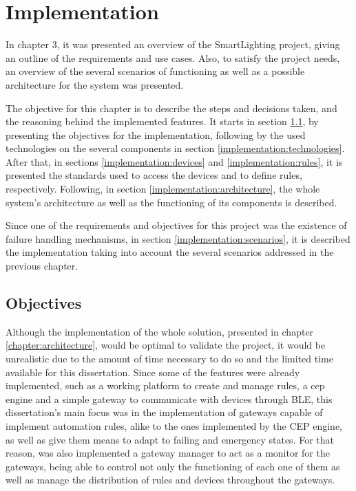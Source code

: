 \chapter{Implementation}
\label{chapter:implementation}

In chapter 3, it was presented an overview of the SmartLighting project, giving an outline of the requirements and use cases. Also, to satisfy the project needs, an overview of the several scenarios of functioning as well as a possible architecture for the system was presented.

The objective for this chapter is to describe the steps and decisions taken, and the reasoning behind the implemented features. It starts in section \ref{implementation:objectives}, by presenting the objectives for the implementation, following by the used technologies on the several components in section \ref{implementation:technologies}. After that, in sections \ref{implementation:devices} and \ref{implementation:rules}, it is presented the standards used to access the devices and to define rules, respectively. Following, in section \ref{implementation:architecture}, the whole system's architecture as well as the functioning of its components is described. 

Since one of the requirements and objectives for this project was the existence of failure handling mechanisms, in section \ref{implementation:scenarios}, it is described the implementation taking into account the several scenarios addressed in the previous chapter. 

\newpage

\section{Objectives}
\label{implementation:objectives}

Although the implementation of the whole solution, presented in chapter \ref{chapter:architecture}, would be optimal to validate the project, it would be unrealistic due to the amount of time necessary to do so and the limited time available for this dissertation. Since some of the features were already implemented, such as a working platform to create and manage rules, a \ac{cep} engine and a simple gateway to communicate with devices through BLE, this dissertation's main focus was in the implementation of gateways capable of implement automation rules, alike to the ones implemented by the CEP engine, as well as give them means to adapt to failing and emergency states. For that reason, was also implemented a gateway manager to act as a monitor for the gateways, being able to control not only the functioning of each one of them as well as manage the distribution of rules and devices throughout the gateways.


